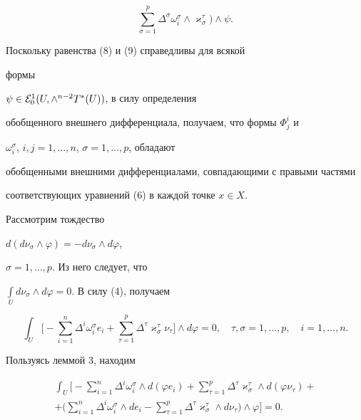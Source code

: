 \begin{pf}
\begin{equation}
\sum_{\sigma=1}^{p}\Delta^{\sigma}\omega^{\sigma}_i\wedge


\varkappa^{\tau}_{\sigma}\biggr)\wedge\psi.


\end{equation}


Поскольку равенства (8) и (9) справедливы для всякой


формы


$\psi\in {\cal E}^1_0(U,\wedge^{n-2}T^*(U))$, в силу определения


обобщенного внешнего дифференциала, получаем, что формы $\Phi^i_j$ и


$\omega^{\sigma}_i$, $i,j= 1,\dotsc,n$, $\sigma= 1,\dotsc,p$, обладают


обобщенными внешними дифференциалами, совпадающими с правыми частями


соответствующих уравнений (6) в каждой точке $x\in X$.





Рассмотрим тождество


$d(d\nu_{\sigma}\wedge \varphi)= -d\nu_{\sigma}\wedge d\varphi$,


$\sigma= 1,\dotsc,p$. Из него следует, что


$\int\limits_{U}d\nu_{\sigma}\wedge d\varphi= 0$. В силу (4), получаем


$$


\int_{U}\biggl[-\sum_{i=1}^{n}\Delta^i\omega^{\sigma}_ie_i+


\sum_{\tau=1}^{p}\Delta^{\tau}\varkappa^{\tau}_{\sigma}\nu_{\tau}\biggr]


\wedge d\varphi=0,\quad \tau,\sigma=1,\dotsc,p,\quad i=1,\dotsc,n.


$$


Пользуясь леммой 3, находим


\begin{gather*}


\int_{U}\biggl[-\sum_{i=1}^{n}\Delta^i\omega^{\sigma}_i


\wedge d(\varphi e_i)+


\sum_{\tau=1}^{p}\Delta^{\tau}\varkappa^{\tau}_{\sigma}\wedge


d(\varphi\nu_{\tau})+\\


+\biggl(\sum_{i=1}^{n}\Delta^i\omega^{\sigma}_i\wedge de_i-


\sum_{\tau=1}^{p}\Delta^{\tau}\varkappa^{\tau}_{\sigma}\wedge


d\nu_{\tau}\biggr)\wedge\varphi\biggr]=0.



\end{gather*}
\end{pf}
